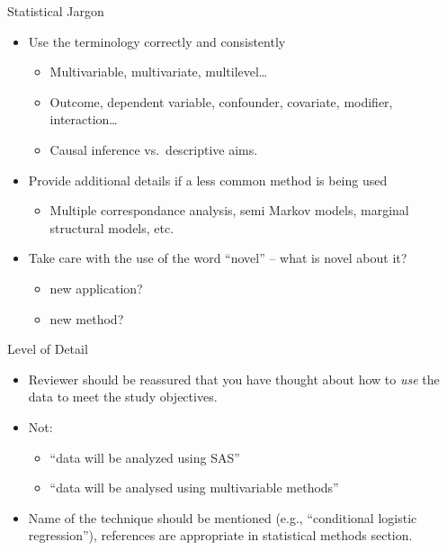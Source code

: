 \documentclass[ignorenonframetext,]{beamer}
\providecommand{\tightlist}{%
  \setlength{\itemsep}{0pt}\setlength{\parskip}{0pt}}
\begin{document}
\begin{frame}{Statistical Jargon}
\protect\hypertarget{statistical-jargon}{}

\begin{itemize}
\tightlist
\item
  Use the terminology correctly and consistently

  \begin{itemize}
  \tightlist
  \item
    Multivariable, multivariate, multilevel\ldots{}
  \item
    Outcome, dependent variable, confounder, covariate, modifier,
    interaction\ldots{}
  \item
    Causal inference vs.~descriptive aims.
  \end{itemize}
\item
  Provide additional details if a less common method is being used

  \begin{itemize}
  \tightlist
  \item
    Multiple correspondance analysis, semi Markov models, marginal
    structural models, etc.
  \end{itemize}
\item
  Take care with the use of the word ``novel'' -- what is novel about
  it?

  \begin{itemize}
  \tightlist
  \item
    new application?
  \item
    new method?
  \end{itemize}
\end{itemize}

\end{frame}

\begin{frame}{Level of Detail}
\protect\hypertarget{level-of-detail}{}

\begin{itemize}
\item
  Reviewer should be reassured that you have thought about how to
  \emph{use} the data to meet the study objectives.
\item
  Not:

  \begin{itemize}
  \tightlist
  \item
    ``data will be analyzed using SAS''
  \item
    ``data will be analysed using multivariable methods''
  \end{itemize}
\item
  Name of the technique should be mentioned (e.g., ``conditional
  logistic regression''), references are appropriate in statistical
  methods section.
\end{itemize}

\end{frame}
\end{document}
